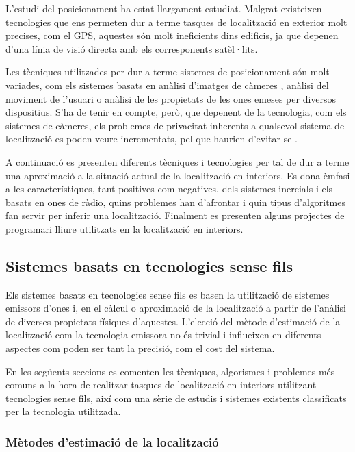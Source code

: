 
L’estudi del posicionament ha estat llargament estudiat. Malgrat existeixen tecnologies que ens permeten dur a terme tasques de localització en exterior molt precises, com el GPS, aquestes són molt ineficients dins edificis, ja que depenen d’una línia de visió directa amb els corresponents satèl·lits.

Les tècniques utilitzades per dur a terme sistemes de posicionament són molt variades, com els  sistemes basats en anàlisi d’imatges de càmeres \cite{martinez} \cite{mulloni}, anàlisi del moviment de l’usuari o anàlisi de les propietats de les ones emeses per diversos dispositius. S’ha de tenir en compte, però, que depenent de la tecnologia, com els sistemes de càmeres, els problemes de privacitat inherents a qualsevol sistema de localització es poden veure incrementats, pel que haurien d’evitar-se \cite{garcia}.

A continuació es presenten diferents tècniques i tecnologies per tal de dur a terme una aproximació a la situació actual de la localització en interiors. Es dona èmfasi a les característiques, tant positives com negatives, dels sistemes inercials i els basats en ones de ràdio, quins problemes han d’afrontar i quin tipus d’algoritmes fan servir per inferir una localització. Finalment es presenten alguns projectes de programari lliure utilitzats en la localització en interiors.

\subsection{Sistemes basats en tecnologies sense fils}

Els sistemes basats en tecnologies sense fils es basen la utilització de sistemes emissors d'ones i, en el càlcul o aproximació de la localització a partir de l'anàlisi de diverses propietats físiques d'aquestes. L'elecció del mètode d'estimació de la localització com la tecnologia emissora no és trivial i influeixen en diferents aspectes com poden ser tant la precisió, com el cost del sistema.

En les següents seccions es comenten les tècniques, algorismes i problemes més comuns a la hora de realitzar tasques de localització en interiors utilitzant tecnologies sense fils, així com una sèrie de estudis i sistemes existents classificats per la tecnologia utilitzada. 

\subsubsection{Mètodes d’estimació de la localització}

